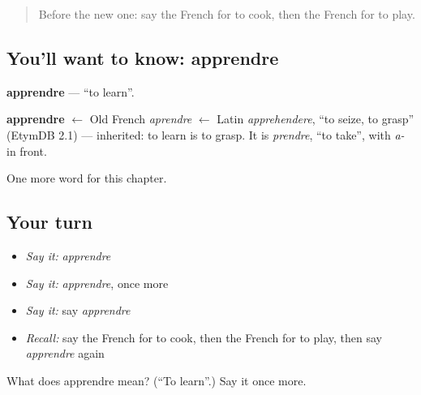 \label{lesson:FR-C60-apprendre}



\begin{quote}
Before the new one: say the French for to cook, then the French for to play.
\end{quote}

\subsection*{You'll want to know: apprendre}
\textbf{apprendre} — \textquotedblleft{}to learn\textquotedblright{}.

\begin{cousinweb}
\textbf{apprendre} $\leftarrow$ Old French \emph{aprendre} $\leftarrow$ Latin \emph{apprehendere}, \textquotedblleft{}to seize, to grasp\textquotedblright{} (EtymDB 2.1) — inherited: to learn is to grasp. It is \emph{prendre}, \textquotedblleft{}to take\textquotedblright{}, with \emph{a-} in front.
\end{cousinweb}

\begin{grammarlens}[title={What you've built}]
One more word for this chapter.
\end{grammarlens}

\subsection*{Your turn}
\begin{itemize}
\raggedright
  \item \emph{Say it:} \emph{apprendre}
  \item \emph{Say it:} \emph{apprendre}, once more
  \item \emph{Say it:} say \emph{apprendre}
  \item \emph{Recall:} say the French for to cook, then the French for to play, then say \emph{apprendre} again
\end{itemize}

\begin{tcolorbox}[breakable,colback=teal!4,colframe=teal!35!black,title={Before you move on}]
What does apprendre mean? (\textquotedblleft{}To learn\textquotedblright{}.) Say it once more.
\end{tcolorbox}
